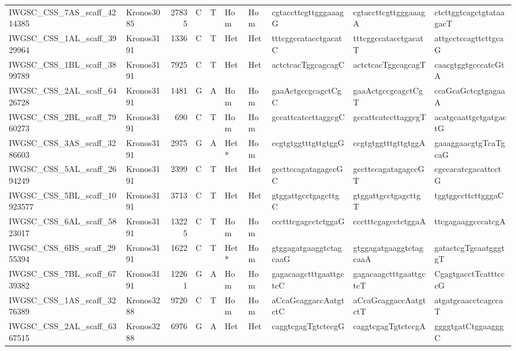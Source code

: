 \begin{longtable}{llrlllllll}
 IWGSC\_CSS\_7AS\_scaff\_4214385  & Kronos3085 & 27835 & C    & T     & Hom    & Hom   & cgtaccttcgttgggaaagG     & cgtaccttcgttgggaaagA     & ctcttggtcagctgtataagacT  \\
 IWGSC\_CSS\_1AL\_scaff\_3929964  & Kronos3191 &  1336 & C    & T     & Het    & Het   & tttcggccatacctgacatC     & tttcggccatacctgacatT     & attgcctccagttcttgcaG     \\
 IWGSC\_CSS\_1BL\_scaff\_3899789  & Kronos3191 &  7925 & C    & T     & Het    & Het   & actctcacTggcagcagC       & actctcacTggcagcagT       & caacgtggtgcccatcGtA      \\
 IWGSC\_CSS\_2AL\_scaff\_6426728  & Kronos3191 &  1481 & G    & A     & Hom    & Hom   & gaaActgccgcagctCgC       & gaaActgccgcagctCgT       & ccaGcaGctcgtgagaaA       \\
 IWGSC\_CSS\_2BL\_scaff\_7960273  & Kronos3191 &   690 & C    & T     & Hom    & Hom   & gccattcatccttaggcgC      & gccattcatccttaggcgT      & acatgcaattgctgatgactG    \\
 IWGSC\_CSS\_3AS\_scaff\_3286603  & Kronos3191 &  2975 & G    & A     & Het*   & Hom   & ccgtgtggtttgttgtggG      & ccgtgtggtttgttgtggA      & gaaaggaacgtgTcaTgcaG     \\
 IWGSC\_CSS\_5AL\_scaff\_2694249  & Kronos3191 &  2399 & C    & T     & Het    & Het   & gccttccagatagagccGC      & gccttccagatagagccGT      & cgccacatcgacattcctG      \\
 IWGSC\_CSS\_5BL\_scaff\_10923577 & Kronos3191 &  3713 & C    & T     & Het    & Het   & gtggattgcctgagcttgC      & gtggattgcctgagcttgT      & tggtggccttcttgggaC       \\
 IWGSC\_CSS\_6AL\_scaff\_5823017  & Kronos3191 & 13225 & C    & T     & Hom    & Hom   & ccctttcgagcctctggaG      & ccctttcgagcctctggaA      & ttcgagaaggcccatcgA       \\
 IWGSC\_CSS\_6BS\_scaff\_2955394  & Kronos3191 &  1622 & C    & T     & Het*   & Hom   & gtggagatgaaggtctagcaaG   & gtggagatgaaggtctagcaaA   & gatactcgTgcaatgggtgT     \\
 IWGSC\_CSS\_7BL\_scaff\_6739382  & Kronos3191 & 12261 & G    & A     & Hom    & Hom   & gagacaagctttgaattgctcC   & gagacaagctttgaattgctcT   & CgagtgacctTcatttcccG     \\
 IWGSC\_CSS\_1AS\_scaff\_3276389  & Kronos3288 &  9720 & C    & T     & Hom    & Hom   & aCcaGcaggaccAatgtctC     & aCcaGcaggaccAatgtctT     & atgatgcaacctcagccaT      \\
 IWGSC\_CSS\_2AL\_scaff\_6367515  & Kronos3288 &  6976 & G    & A     & Het    & Het   & caggtcgagTgtctccgG       & caggtcgagTgtctccgA       & ggggtgatCtggaagggC       \\

\end{longtable}

